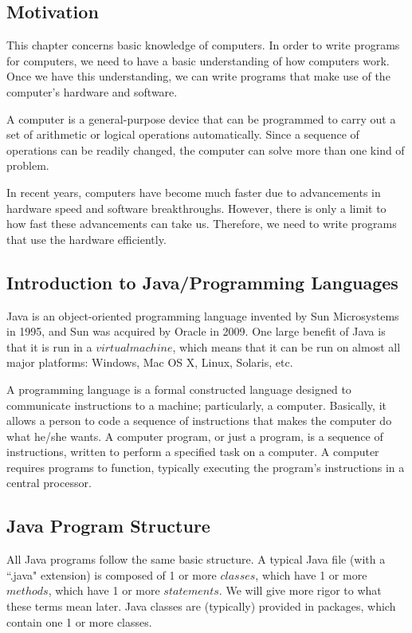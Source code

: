 %
\subsection{Motivation}
This chapter concerns basic knowledge of computers. In order to write programs for computers, we need to have a basic understanding of how computers work. Once we have this understanding, we can write programs that make use of the computer's hardware and software. 

\par A computer is a general-purpose device that can be programmed to carry out a set of arithmetic or logical operations automatically. Since a sequence of operations can be readily changed, the computer can solve more than one kind of problem.

\par In recent years, computers have become much faster due to advancements in hardware speed and software breakthroughs. However, there is only a limit to how fast these advancements can take us. Therefore, we need to write programs that use the hardware efficiently.

\subsection{Introduction to Java/Programming Languages}
Java is an object-oriented programming language invented by Sun Microsystems in 1995, and Sun was acquired by Oracle in 2009. One large benefit of Java is that it is run in a $virtual machine$, which means that it can be run on almost all major platforms: Windows, Mac OS X, Linux, Solaris, etc. 

\par A programming language is a formal constructed language designed to communicate instructions to a machine; particularly, a computer. Basically, it allows a person to code a sequence of instructions that makes the computer do what he/she wants. A computer program, or just a program, is a sequence of instructions, written to perform a specified task on a computer. A computer requires programs to function, typically executing the program's instructions in a central processor.

\subsection{Java Program Structure}
All Java programs follow the same basic structure. A typical Java file (with a ``.java" extension) is composed of 1 or more $classes$, which have 1 or more $methods$, which have 1 or more $statements$. We will give more rigor to what these terms mean later. Java classes are (typically) provided in packages, which contain one 1 or more classes.

